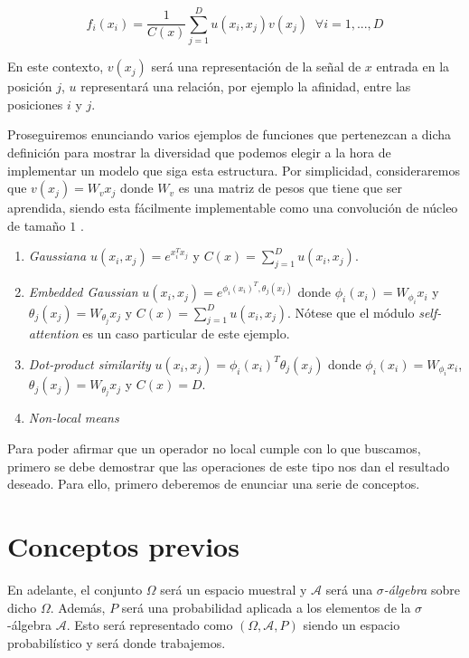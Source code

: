 \begin{itemize}
\begin{definicion}
 $$f_i(x_i)=\frac{1}{C(x)}\sum_{j=1}^{D} u(x_i,x_j)v(x_j) \; \;  \forall i=1,...,D$$
\end{definicion}

 En este contexto, $v(x_j)$ será una representación de la señal de $x$ entrada en la posición $j$, $u$ representará una relación, por ejemplo la afinidad, entre las posiciones $i$ y $j$. %
\newline

 Proseguiremos enunciando varios ejemplos de funciones que pertenezcan a dicha definición para mostrar la diversidad que podemos elegir a la hora de implementar un modelo que siga esta estructura. Por simplicidad, consideraremos que $v(x_j)=W_v x_j$ donde $W_v$ es una matriz de pesos que tiene que ser aprendida, siendo esta fácilmente implementable como una convolución de núcleo de tamaño $1$ \cite{Buades:2005:NAI:1068508.1069066} \cite{DBLP:journals/corr/abs-1711-07971}.

 \begin{enumerate}
 \item \emph{Gaussiana} $u(x_i,x_j)=e^{x_i^T x_j}$ y $C(x)= \sum_{j=1}^D u(x_i,x_j)$.
 \item \emph{Embedded Gaussian} $u(x_i,x_j)=e^{\phi_i(x_i)^T,\theta_j(x_j)}$ donde $\phi_i(x_i)=W_{\phi_i} x_i$ y $\theta_j(x_j)=W_{\theta_j} x_j$ y  $C(x)= \sum_{j=1}^D u(x_i,x_j)$. Nótese que el módulo \emph{self-attention} \cite{DBLP:journals/corr/VaswaniSPUJGKP17} es un caso particular de este ejemplo.
 \item \emph{Dot-product similarity} $u(x_i,x_j)=\phi_i(x_i)^T \theta_j(x_j)$ donde $\phi_i(x_i)=W_{\phi_i} x_i$, $\theta_j(x_j)=W_{\theta_j} x_j$ y $C(x)=D$.
 \item \emph{Non-local means} \cite{Buades:2005:NAI:1068508.1069066}
 \end{enumerate}

Para poder afirmar que un operador no local cumple con lo que buscamos, primero se debe demostrar que las operaciones de este tipo nos dan el resultado deseado. Para ello, primero deberemos de enunciar una serie de conceptos.

\section{Conceptos previos}
En adelante, el conjunto $\Omega$ será un espacio muestral y $\mathscr{A}$ será una \emph{$\sigma$-álgebra} sobre dicho $\Omega$. Además, $P$ será una probabilidad aplicada a los elementos de la $\sigma$-álgebra $\mathscr{A}$. Esto será representado como $(\Omega,\mathscr{A},P)$ siendo un espacio probabilístico y será donde trabajemos.


\end{itemize}
